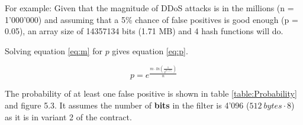 For example: Given that the magnitude of DDoS attacks is in the millions (n = 1'000'000) and assuming that a 5\% chance of false positives is good enough (p = 0.05), an array size of 14357134 bits (1.71 MB) and 4 hash functions will do.

Solving equation \ref{eq:m} for $p$ gives equation \ref{eq:p}.

\begin{equation}
p = e^{\frac{{m \cdot ln(\frac{1}{2^{ln(2)}})}}{n}}
\label{eq:p}
\end{equation}

The probability of at least one false positive is shown in table \ref{table:Probability} and figure 5.3. It assumes the number of \textbf{bits} in the filter is 4'096 ($512\ bytes \cdot 8$) as it is in variant 2 of the contract.

